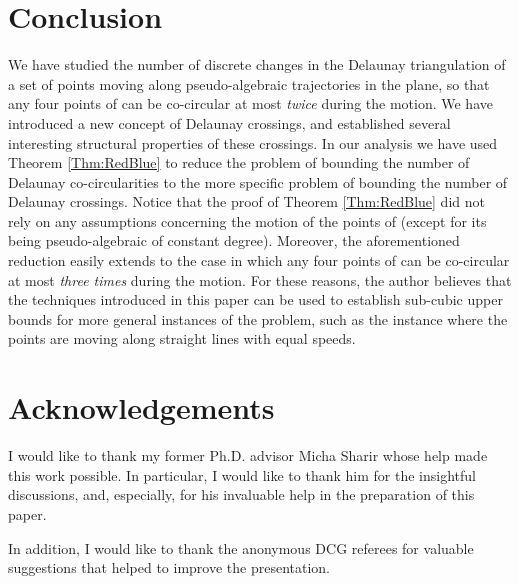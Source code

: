 \documentclass[letter,11pt]{article}
\begin{document}
\section{Conclusion} We have studied the number of discrete changes in the Delaunay triangulation of a set  of  points moving along pseudo-algebraic trajectories in the plane, so that any four points of  can be co-circular at most {\it twice} during the motion. 
We have introduced a new concept of Delaunay crossings, and established several interesting structural properties of these crossings.
In our analysis we have used Theorem \ref{Thm:RedBlue} to reduce the problem of bounding the number of Delaunay co-circularities to the more specific problem of bounding the number of Delaunay crossings. Notice that the proof of Theorem \ref{Thm:RedBlue} did not rely on any assumptions concerning the motion of the points of  (except for its being pseudo-algebraic of constant degree). Moreover, the aforementioned reduction easily extends to 
the case in which any four points of  can be co-circular at most {\it three times} during the motion.
For these reasons, the author believes that the techniques introduced in this paper can be used to establish sub-cubic upper bounds for more general instances of the problem, such as the instance where the points are moving along straight lines with equal speeds.

\section{Acknowledgements} I would like to thank my former Ph.D. advisor Micha Sharir 
whose help made this work possible.
In particular, I would like to thank him for the insightful discussions, and, especially, for his invaluable help in the preparation of this paper. 

In addition, I would like to thank the anonymous
DCG referees for valuable suggestions that helped to improve the
presentation.
\end{document}
